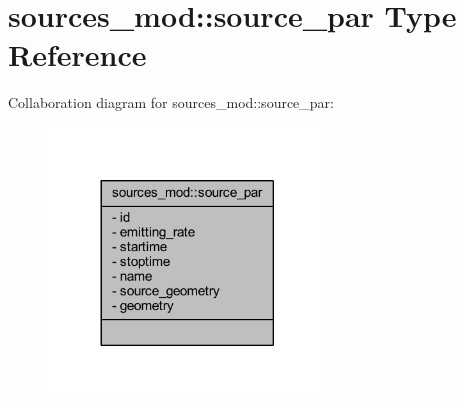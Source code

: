 \hypertarget{structsources__mod_1_1source__par}{}\section{sources\+\_\+mod\+:\+:source\+\_\+par Type Reference}
\label{structsources__mod_1_1source__par}


Collaboration diagram for sources\+\_\+mod\+:\+:source\+\_\+par\+:\nopagebreak
\begin{figure}[H]
\begin{center}
\leavevmode
\includegraphics[width=209pt]{structsources__mod_1_1source__par__coll__graph}
\end{center}
\end{figure}
